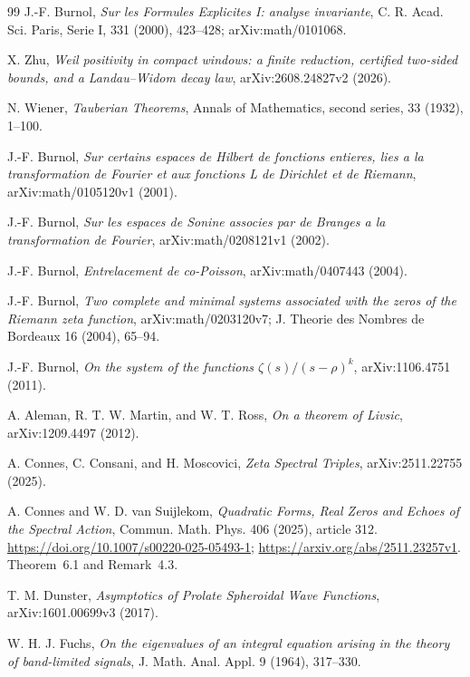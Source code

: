 \documentclass[11pt]{article}
\theoremstyle{remark}
\begin{document}
\begin{thebibliography}{99}
\small
\setlength{\itemsep}{2pt}
J.-F. Burnol,
\emph{Sur les Formules Explicites I: analyse invariante},
C. R. Acad. Sci. Paris, Serie I, 331 (2000), 423--428;
arXiv:math/0101068.

X. Zhu,
\emph{Weil positivity in compact windows: a finite reduction,
certified two-sided bounds, and a Landau--Widom decay law},
arXiv:2608.24827v2 (2026).

N. Wiener,
\emph{Tauberian Theorems},
Annals of Mathematics, second series, 33 (1932), 1--100.

J.-F. Burnol,
\emph{Sur certains espaces de Hilbert de fonctions entieres, lies a la transformation de Fourier et aux fonctions L de Dirichlet et de Riemann},
arXiv:math/0105120v1 (2001).

J.-F. Burnol,
\emph{Sur les espaces de Sonine associes par de Branges a la transformation de Fourier},
arXiv:math/0208121v1 (2002).

J.-F. Burnol,
\emph{Entrelacement de co-Poisson},
arXiv:math/0407443 (2004).

J.-F. Burnol,
\emph{Two complete and minimal systems associated with the zeros of the Riemann zeta function},
arXiv:math/0203120v7; J. Theorie des Nombres de Bordeaux 16 (2004), 65--94.

J.-F. Burnol,
\emph{On the system of the functions $\zeta(s)/(s-\rho)^k$},
arXiv:1106.4751 (2011).

A. Aleman, R. T. W. Martin, and W. T. Ross,
\emph{On a theorem of Livsic},
arXiv:1209.4497 (2012).

A. Connes, C. Consani, and H. Moscovici,
\emph{Zeta Spectral Triples},
arXiv:2511.22755 (2025).

A. Connes and W. D. van Suijlekom,
\emph{Quadratic Forms, Real Zeros and Echoes of the Spectral Action},
Commun. Math. Phys. 406 (2025), article 312.
\url{https://doi.org/10.1007/s00220-025-05493-1};
\url{https://arxiv.org/abs/2511.23257v1}.
Theorem~6.1 and Remark~4.3.

T. M. Dunster,
\emph{Asymptotics of Prolate Spheroidal Wave Functions},
arXiv:1601.00699v3 (2017).

W. H. J. Fuchs,
\emph{On the eigenvalues of an integral equation arising in the theory of band-limited signals},
J. Math. Anal. Appl. 9 (1964), 317--330.


\end{thebibliography}
\end{document}
